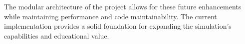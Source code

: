 \documentclass[12pt]{report}
\begin{document}
The modular architecture of the project allows for these future enhancements while maintaining performance and code maintainability. The current implementation provides a solid foundation for expanding the simulation's capabilities and educational value.


\end{document}
